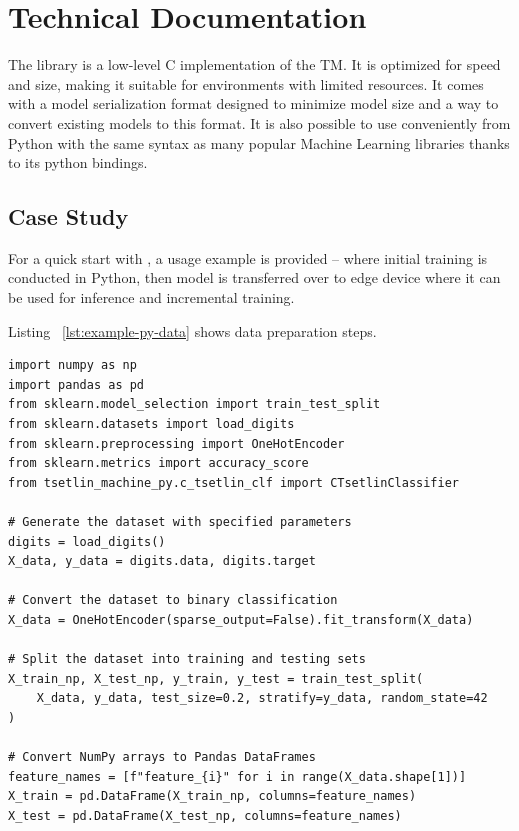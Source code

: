 \chapter{Technical Documentation}
\label{chap:technical-documentation}

The \LibraryName library is a low-level C implementation of the TM.
It is optimized for speed and size, making it suitable for environments with limited resources.
It comes with a model serialization format designed to minimize model size and a way to convert existing \GreenTsetlinName models to this format.
It is also possible to use \LibraryName conveniently from Python with the same syntax as many popular Machine Learning libraries thanks to its python bindings.

\section{Case Study}
For a quick start with \LibraryName, a usage example is provided -- where initial training is conducted in Python, then model is transferred over to edge device where it can be used for inference and incremental training.

Listing ~\ref{lst:example-py-data} shows data preparation steps.

\begin{listing}[!htbp]
    \caption{Example Python data preparation steps\label{lst:example-py-data}}
    \begin{verbatim}
import numpy as np
import pandas as pd
from sklearn.model_selection import train_test_split
from sklearn.datasets import load_digits
from sklearn.preprocessing import OneHotEncoder
from sklearn.metrics import accuracy_score
from tsetlin_machine_py.c_tsetlin_clf import CTsetlinClassifier

# Generate the dataset with specified parameters
digits = load_digits()
X_data, y_data = digits.data, digits.target

# Convert the dataset to binary classification
X_data = OneHotEncoder(sparse_output=False).fit_transform(X_data)

# Split the dataset into training and testing sets
X_train_np, X_test_np, y_train, y_test = train_test_split(
    X_data, y_data, test_size=0.2, stratify=y_data, random_state=42
)

# Convert NumPy arrays to Pandas DataFrames
feature_names = [f"feature_{i}" for i in range(X_data.shape[1])]
X_train = pd.DataFrame(X_train_np, columns=feature_names)
X_test = pd.DataFrame(X_test_np, columns=feature_names)
    \end{verbatim}
\end{listing}
\FloatBarrier

